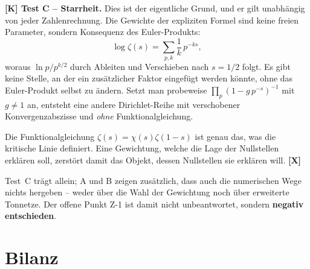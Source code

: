 \textbf{[K] Test C -- Starrheit.} Dies ist der eigentliche Grund, und
er gilt unabh\"angig von jeder Zahlenrechnung. Die Gewichte der
expliziten Formel sind keine freien Parameter, sondern Konsequenz des
Euler-Produkts:
\[
  \log\zeta(s) = \sum_{p,k} \frac1k\,p^{-ks},
\]
woraus $\ln p / p^{k/2}$ durch Ableiten und Verschieben nach $s = 1/2$
folgt. Es gibt keine Stelle, an der ein zus\"atzlicher Faktor eingef\"ugt
werden k\"onnte, ohne das Euler-Produkt selbst zu \"andern. Setzt man
probeweise $\prod_p (1 - g\,p^{-s})^{-1}$ mit $g \neq 1$ an, entsteht
eine andere Dirichlet-Reihe mit verschobener Konvergenzabszisse und
\emph{ohne} Funktionalgleichung.

\begin{keyresult}
Die Funktionalgleichung $\zeta(s) = \chi(s)\zeta(1-s)$ ist genau das,
was die kritische Linie definiert. Eine Gewichtung, welche die Lage
der Nullstellen erkl\"aren soll, zerst\"ort damit das Objekt, dessen
Nullstellen sie erkl\"aren will. \textbf{[X]}
\end{keyresult}

Test~C tr\"agt allein; A und B zeigen zus\"atzlich, dass auch die
numerischen Wege nichts hergeben -- weder \"uber die Wahl der
Gewichtung noch \"uber erweiterte Tonnetze. Der offene Punkt Z-1 ist damit nicht
unbeantwortet, sondern \textbf{negativ entschieden}.

\section{Bilanz}

